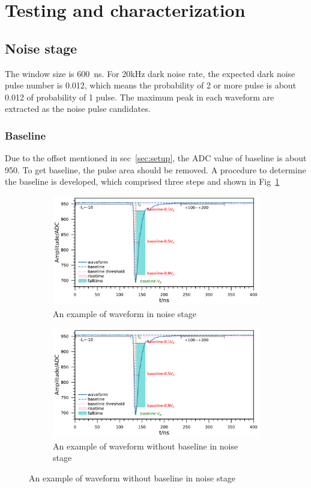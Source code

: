 \section{Testing and characterization}
\label{Result}

\subsection{Noise stage}
The window size is \SI{600}{ns}. For 20kHz dark noise rate, the expected dark noise pulse number is 0.012, which means the probability of 2 or more pulse is about 0.012 of probability of 1 pulse. The maximum peak in each waveform are extracted as the noise pulse candidates.
\subsubsection{Baseline}
Due to the offset mentioned in sec~\ref{sec:setup}, the ADC value of baseline is about 950. To get baseline, the pulse area should be removed. A procedure to determine the baseline is developed, which comprised three steps and shown in Fig~\ref{fig:baseline1}
\begin{figure}
    \centering
    \begin{subfigure}[b]{\textwidth}
        \includegraphics[width=\textwidth,page=1]{figures/result/noisebaseline697_219908_2.pdf}
        \caption{An example of waveform in noise stage}
        \label{fig:baseline1}
    \end{subfigure}
    \begin{subfigure}[b]{\textwidth}
        \includegraphics[width=\textwidth,page=3]{figures/result/noisebaseline697_219908_2.pdf}
        \caption{An example of waveform without baseline in noise stage}
        \label{fig:baseline2}
    \end{subfigure}
\end{figure}

